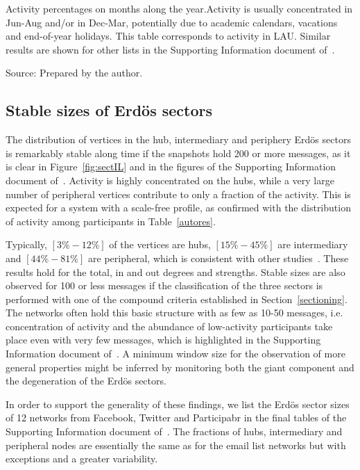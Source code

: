 \begin{table}
\caption{Activity percentages on months along the year.Activity is usually concentrated in Jun-Aug and/or in Dec-Mar, potentially due to academic calendars, vacations and end-of-year holidays. This table corresponds to activity in LAU. Similar results are shown for other lists in the Supporting Information document of~\cite{stab}.}
\footnotesize

\label{tab:min22}
\begin{flushleft}
Source: Prepared by the author.\
\end{flushleft}
\end{table}


\subsection{Stable sizes of Erd\"os sectors}\label{subsec:pih}

The distribution of vertices in the hub, intermediary and periphery Erd\"os sectors is remarkably stable along time if the snapshots hold 200 or more messages,
as it is clear in Figure~\ref{fig:sectIL} and in the figures of the Supporting Information document of~\cite{stab}.
Activity is highly concentrated on the hubs, while a very large number of peripheral vertices contribute to only a fraction of the activity.
This is expected for a system with a scale-free profile, as confirmed with the distribution of activity among participants in Table~\ref{autores}.

Typically, $[3\%-12\%]$ of the vertices are hubs,
$[15\%-45\%]$ are intermediary and $[44\%-81\%]$ are peripheral,
which is consistent with other studies~\cite{secFree}.
These results hold for the total, in and out degrees and strengths.
Stable sizes are also observed for 100 or less messages if the classification 
of the three sectors is performed with one of the compound criteria established in Section~\ref{sectioning}. The networks often hold this basic structure with as few as 10-50 messages, i.e. concentration of activity and the abundance of low-activity participants take place even with very few messages, which is highlighted in the Supporting Information document of~\cite{stab}.
A minimum window size for the observation of more general properties might be inferred by monitoring 
both the giant component and the degeneration of the Erd\"os sectors.

In order to support the generality of these findings,
we list the Erd\"os sector sizes of 12 networks from Facebook, Twitter and Participabr in the final tables of the
Supporting Information document of~\cite{stab}.
The fractions of hubs, intermediary and peripheral nodes are
essentially the same as for the email list networks but with exceptions and a greater variability.

